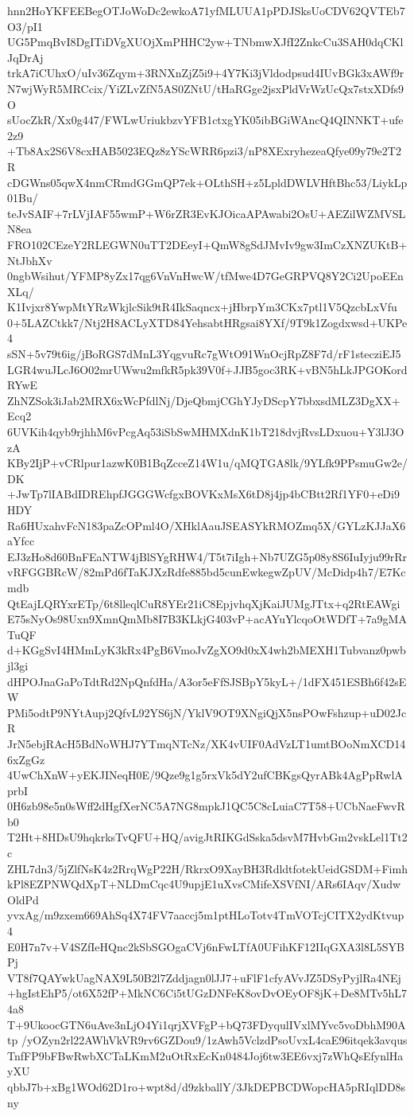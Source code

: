 hnn2HoYKFEEBegOTJoWoDc2ewkoA71yfMLUUA1pPDJSksUoCDV62QVTEb7O3/pI1
UG5PmqBvI8DgITiDVgXUOjXmPHHC2yw+TNbmwXJfI2ZnkcCu3SAH0dqCKlJqDrAj
trkA7iCUhxO/uIv36Zqym+3RNXnZjZ5i9+4Y7Ki3jVldodpsud4IUvBGk3xAWf9r
N7wjWyR5MRCcix/YiZLvZfN5AS0ZNtU/tHaRGge2jsxPldVrWzUcQx7stxXDfs9O
sUocZkR/Xx0g447/FWLwUriukbzvYFB1ctxgYK05ibBGiWAncQ4QINNKT+ufe2z9
+Tb8Ax2S6V8cxHAB5023EQz8zYScWRR6pzi3/nP8XExryhezeaQfye09y79e2T2R
cDGWns05qwX4nmCRmdGGmQP7ek+OLthSH+z5LpldDWLVHftBhc53/LiykLp01Bu/
teJvSAIF+7rLVjIAF55wmP+W6rZR3EvKJOicaAPAwabi2OsU+AEZilWZMVSLN8ea
FRO102CEzeY2RLEGWN0uTT2DEeyI+QmW8gSdJMvIv9gw3ImCzXNZUKtB+NtJbhXv
0ngbWsihut/YFMP8yZx17qg6VnVnHwcW/tfMwe4D7GeGRPVQ8Y2Ci2UpoEEnXLq/
K1Ivjxr8YwpMtYRzWkjlcSik9tR4IkSaqncx+jHbrpYm3CKx7ptl1V5QzcbLxVfu
0+5LAZCtkk7/Ntj2H8ACLyXTD84YehsabtHRgsai8YXf/9T9k1Zogdxwsd+UKPe4
sSN+5v79t6ig/jBoRGS7dMnL3YqgvuRc7gWtO91WnOcjRpZ8F7d/rF1stecziEJ5
LGR4wuJLcJ6O02mrUWwu2mfkR5pk39V0f+JJB5goc3RK+vBN5hLkJPGOKordRYwE
ZhNZSok3iJab2MRX6xWcPfdlNj/DjeQbmjCGhYJyDScpY7bbxsdMLZ3DgXX+Ecq2
6UVKih4qyb9rjhhM6vPcgAq53iSbSwMHMXdnK1bT218dvjRvsLDxuou+Y3lJ3OzA
KBy2IjP+vCRlpur1azwK0B1BqZcceZ14W1u/qMQTGA8lk/9YLfk9PPsmuGw2e/DK
+JwTp7lIABdIDREhpfJGGGWcfgxBOVKxMsX6tD8j4jp4bCBtt2Rf1YF0+eDi9HDY
Ra6HUxahvFcN183paZcOPml4O/XHklAauJSEASYkRMOZmq5X/GYLzKJJaX6aYfcc
EJ3zHo8d60BnFEaNTW4jBlSYgRHW4/T5t7iIgh+Nb7UZG5p08y8S6IuIyju99rRr
vRFGGBRcW/82mPd6fTaKJXzRdfe885bd5cunEwkegwZpUV/McDidp4h7/E7Kcmdb
QtEajLQRYxrETp/6t8lleqlCuR8YEr21iC8EpjvhqXjKaiJUMgJTtx+q2RtEAWgi
E75sNyOs98Uxn9XmnQmMb8I7B3KLkjG403vP+acAYuYlcqoOtWDfT+7a9gMATuQF
d+KGgSvI4HMmLyK3kRx4PgB6VmoJvZgXO9d0xX4wh2bMEXH1Tubvanz0pwbjl3gi
dHPOJnaGaPoTdtRd2NpQnfdHa/A3or5eFfSJSBpY5kyL+/1dFX451ESBh6f42sEW
PMi5odtP9NYtAupj2QfvL92YS6jN/YklV9OT9XNgiQjX5nsPOwFshzup+uD02JcR
JrN5ebjRAcH5BdNoWHJ7YTmqNTcNz/XK4vUIF0AdVzLT1umtBOoNmXCD146xZgGz
4UwChXnW+yEKJINeqH0E/9Qze9g1g5rxVk5dY2ufCBKgsQyrABk4AgPpRwlAprbI
0H6zb98e5n0sWff2dHgfXerNC5A7NG8mpkJ1QC5C8cLuiaC7T58+UCbNaeFwvRb0
T2Ht+8HDsU9hqkrksTvQFU+HQ/avigJtRIKGdSska5dsvM7HvbGm2vskLel1Tt2c
ZHL7dn3/5jZlfNsK4z2RrqWgP22H/RkrxO9XayBH3RdldtfotekUeidGSDM+Fimh
kPl8EZPNWQdXpT+NLDmCqc4U9upjE1uXvsCMifeXSVfNI/ARs6IAqv/XudwOldPd
yvxAg/m9zxem669AhSq4X74FV7aaccj5m1ptHLoTotv4TmVOTcjCITX2ydKtvup4
E0H7n7v+V4SZfIeHQnc2kSbSGOgaCVj6nFwLTfA0UFihKF12IIqGXA3l8L5SYBPj
VT8f7QAYwkUagNAX9L50B2l7Zddjagn0lJJ7+uFlF1cfyAVvJZ5DSyPyjlRa4NEj
+hgIstEhP5/ot6X52fP+MkNC6Ci5tUGzDNFeK8ovDvOEyOF8jK+De8MTv5hL74a8
T+9UkoocGTN6uAve3nLjO4Yi1qrjXVFgP+bQ73FDyqulIVxlMYvc5voDbhM90Atp
/yOZyn2rl22AWhVkVR9rv6GZDou9/1zAwh5VclzdPsoUvxL4caE96itqek3avqus
TnfFP9bFBwRwbXCTaLKmM2uOtRxEcKn0484Joj6tw3EE6vxj7zWhQsEfynlHayXU
qbbJ7b+xBg1WOd62D1ro+wpt8d/d9zkballY/3JkDEPBCDWopcHA5pRIqlDD8sny
